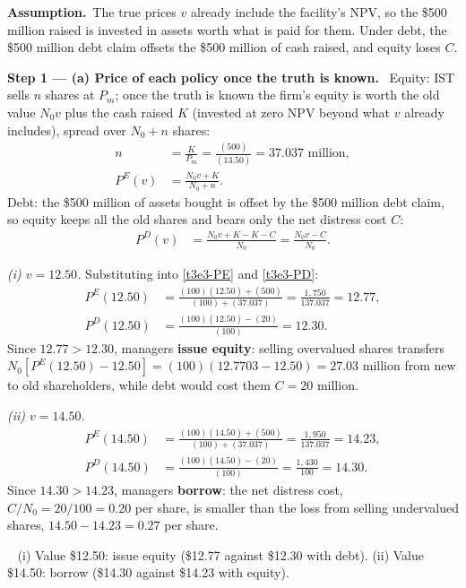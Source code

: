 \documentclass[11pt,a4paper]{article}
\newcommand{\step}[2]{\par\medskip\noindent\textbf{Step #1 --- #2.}~}
\newcommand{\assume}{\par\smallskip\noindent\textbf{Assumption.}~}
\newcommand{\answer}[1]{\par\smallskip\noindent\fbox{\textbf{Answer #1.}}~}
\begin{document}
\assume The true prices $v$ already include the facility's NPV, so the \$500 million raised is invested in assets worth what is paid for them. Under debt, the \$500 million debt claim offsets the \$500 million of cash raised, and equity loses $C$.

\step{1}{(a) Price of each policy once the truth is known} Equity: IST sells $n$ shares at $P_m$; once the truth is known the firm's equity is worth the old value $N_0v$ plus the cash raised $K$ (invested at zero NPV beyond what $v$ already includes), spread over $N_0+n$ shares:
\begin{align}
  n &= \frac{K}{P_m} = \frac{(500)}{(13.50)} = 37.037 \text{ million}, \label{t3e3-n}\\
  P^E(v) &= \frac{N_0 v + K}{N_0+n}. \label{t3e3-PE}
\end{align}
Debt: the \$500 million of assets bought is offset by the \$500 million debt claim, so equity keeps all the old shares and bears only the net distress cost $C$:
\begin{align}
  P^D(v) &= \frac{N_0 v + K - K - C}{N_0} = \frac{N_0 v - C}{N_0}. \label{t3e3-PD}
\end{align}

\textit{(i) $v=12.50$.} Substituting into \eqref{t3e3-PE} and \eqref{t3e3-PD}:
\begin{align}
  P^E(12.50) &= \frac{(100)(12.50)+(500)}{(100)+(37.037)} = \frac{1{,}750}{137.037} = 12.77, \nonumber\\
  P^D(12.50) &= \frac{(100)(12.50)-(20)}{(100)} = 12.30. \nonumber
\end{align}
Since $12.77>12.30$, managers \textbf{issue equity}: selling overvalued shares transfers $N_0[P^E(12.50)-12.50]=(100)(12.7703-12.50)=27.03$ million from new to old shareholders, while debt would cost them $C=20$ million.

\textit{(ii) $v=14.50$.}
\begin{align}
  P^E(14.50) &= \frac{(100)(14.50)+(500)}{(100)+(37.037)} = \frac{1{,}950}{137.037} = 14.23, \nonumber\\
  P^D(14.50) &= \frac{(100)(14.50)-(20)}{(100)} = \frac{1{,}430}{100} = 14.30. \nonumber
\end{align}
Since $14.30>14.23$, managers \textbf{borrow}: the net distress cost, $C/N_0=20/100=0.20$ per share, is smaller than the loss from selling undervalued shares, $14.50-14.23=0.27$ per share.

\answer{(a)} (i) Value \$12.50: issue equity (\$12.77 against \$12.30 with debt). (ii) Value \$14.50: borrow (\$14.30 against \$14.23 with equity).
\end{document}
